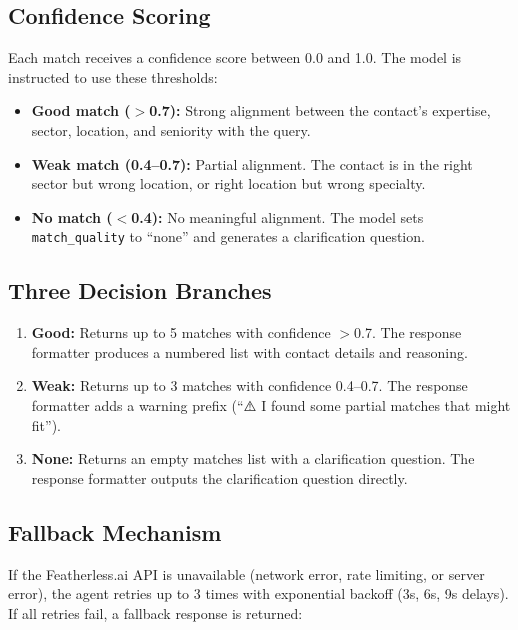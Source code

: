 \documentclass[12pt, a4paper]{report}
\begin{document}
\subsection{Confidence Scoring}

Each match receives a confidence score between 0.0 and 1.0. The model is instructed to use these thresholds:

\begin{itemize}[itemsep=3pt]
    \item \textbf{Good match ($>$0.7):} Strong alignment between the contact's expertise, sector, location, and seniority with the query.
    \item \textbf{Weak match (0.4--0.7):} Partial alignment. The contact is in the right sector but wrong location, or right location but wrong specialty.
    \item \textbf{No match ($<$0.4):} No meaningful alignment. The model sets \texttt{match\_quality} to ``none'' and generates a clarification question.
\end{itemize}

\subsection{Three Decision Branches}

\begin{enumerate}[itemsep=4pt]
    \item \textbf{Good:} Returns up to 5 matches with confidence $>$0.7. The response formatter produces a numbered list with contact details and reasoning.
    \item \textbf{Weak:} Returns up to 3 matches with confidence 0.4--0.7. The response formatter adds a warning prefix (``⚠️ I found some partial matches that might fit'').
    \item \textbf{None:} Returns an empty matches list with a clarification question. The response formatter outputs the clarification question directly.
\end{enumerate}

\subsection{Fallback Mechanism}

If the Featherless.ai API is unavailable (network error, rate limiting, or server error), the agent retries up to 3 times with exponential backoff (3s, 6s, 9s delays). If all retries fail, a fallback response is returned:
\end{document}
